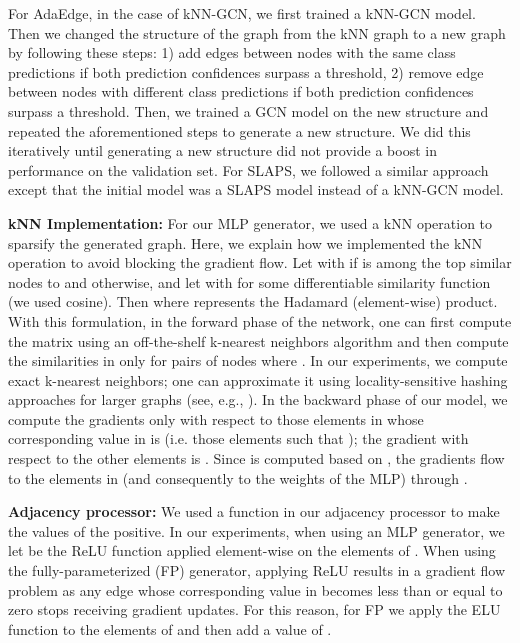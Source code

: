 \documentclass{article}
\begin{document}
For AdaEdge, in the case of kNN-GCN, we first trained a kNN-GCN model. Then we changed the structure of the graph from the kNN graph to a new graph by following these steps: 1) add edges between nodes with the same class predictions if both prediction confidences surpass a threshold, 2) remove edge between nodes with different class predictions if both prediction confidences surpass a threshold. Then, we trained a GCN model on the new structure and repeated the aforementioned steps to generate a new structure. We did this iteratively until generating a new structure did not provide a boost in performance on the validation set. For SLAPS, we followed a similar approach except that the initial model was a SLAPS model instead of a kNN-GCN model.

\textbf{kNN Implementation:} For our MLP generator, we used a kNN operation to sparsify the generated graph. Here, we explain how we implemented the kNN operation to avoid blocking the gradient flow. Let  with  if  is among the top  similar nodes to  and  otherwise, and let  with  for some differentiable similarity function  (we used cosine). Then   where  represents the Hadamard (element-wise) product. With this formulation, in the forward phase of the network, one can first compute the matrix  using an off-the-shelf k-nearest neighbors algorithm and then compute the similarities in  only for pairs of nodes where . In our experiments, we compute exact k-nearest neighbors; one can approximate it using locality-sensitive
hashing approaches for larger graphs (see, e.g., \cite{halcrow2020grale,kitaev2020reformer}). In the backward phase of our model, we compute the gradients only with respect to those elements in  whose corresponding value in  is  (i.e. those elements  such that ); the gradient with respect to the other elements is .
Since  is computed based on , the gradients flow to the elements in  (and consequently to the weights of the MLP) through . 

\textbf{Adjacency processor:} We used a function  in our adjacency processor to make the values of the  positive. In our experiments, when using an MLP generator, we let  be the ReLU function applied element-wise on the elements of . When using the fully-parameterized (FP) generator, applying ReLU results in a gradient flow problem as any edge whose corresponding value in  becomes less than or equal to zero stops receiving gradient updates. For this reason, for FP we apply the ELU~\cite{elu} function to the elements of  and then add a value of .
\end{document}
